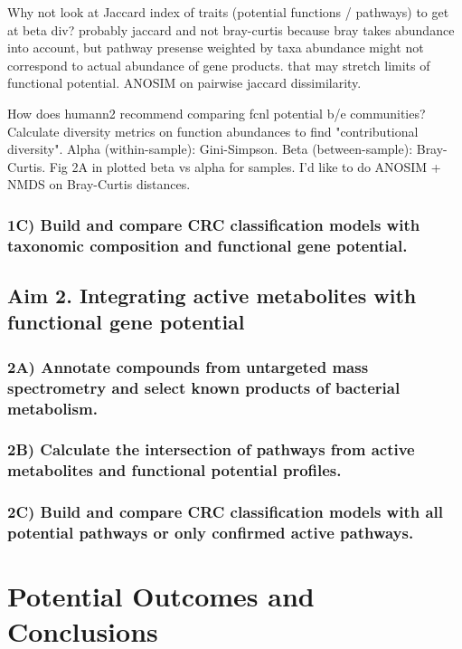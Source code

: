\documentclass[11pt]{article}
\begin{document}
Why not look at Jaccard index of traits (potential functions / pathways) to get at beta div?
probably jaccard and not bray-curtis because bray takes abundance into account, but pathway presense weighted by taxa abundance might not correspond to actual abundance of gene products. that may stretch limits of functional potential.
ANOSIM on pairwise jaccard dissimilarity.

How does humann2 recommend comparing fcnl potential b/e communities?
Calculate diversity metrics on function abundances to find "contributional diversity".
Alpha (within-sample): Gini-Simpson. Beta (between-sample): Bray-Curtis.
Fig 2A in \cite{franzosa_species-level_2018} plotted beta vs alpha for samples.
I'd like to do ANOSIM + NMDS on Bray-Curtis distances.

\subsubsection*{1C) Build and compare CRC classification models with taxonomic composition and functional gene potential.}


\subsection*{Aim 2. Integrating active metabolites with functional gene potential}

\subsubsection*{2A) Annotate compounds from untargeted mass spectrometry and select known products of bacterial metabolism.}

\subsubsection*{2B) Calculate the intersection of pathways from active metabolites and functional potential profiles.}

\subsubsection*{2C) Build and compare CRC classification models with all potential pathways or only confirmed active pathways.}


\section*{Potential Outcomes and Conclusions}


\pagebreak
\footnotesize{

\par}
\end{document}
